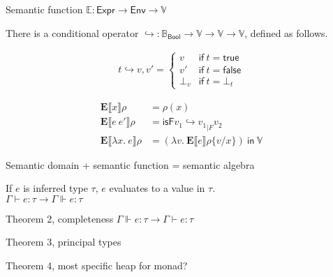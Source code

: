 Semantic function $\mathbb{E} : \mathsf{Expr} \rightarrow \mathsf{Env} \rightarrow \mathbb{V}$


There is a conditional operator $\hookrightarrow : \mathbb{B}_{\textsf{Bool}} \rightarrow \mathbb{V} \rightarrow \mathbb{V} \rightarrow \mathbb{V}$, defined as follows.

\begin{align*}
  t \hookrightarrow v, v' =
  \begin{cases}
    v & \textsf{if} \ t = \textsf{true} \\
    v' & \textsf{if} \ t = \textsf{false} \\
    \bot_v & \textsf{if} \ t = \bot_t
  \end{cases}
\end{align*}

\begin{align*}
  \mathbf{E} \llbracket x \rrbracket \rho &= \rho(x) \\
  \mathbf{E} \llbracket e \ e' \rrbracket \rho &= \textsf{isF} v_1 \hookrightarrow
                                              {v_1}_{|F} v_2 \\
  \mathbf{E} \llbracket \lambda x . \ e \rrbracket \rho &=
  (\lambda v . \ \mathbf{E} \llbracket e \rrbracket \rho \{ v / x \} ) \
                                                 \textsf{in} \ \mathbb{V}
\end{align*}

Semantic domain + semantic function = semantic algebra


\begin{theorem}[Soundness]
  If $e$ is inferred type $\tau$, $e$ evaluates to a value in $\tau$. \\
  $\Gamma \vdash e : \tau \rightarrow \Gamma \Vdash e : \tau$
\end{theorem}

Theorem 2, completeness $\Gamma \Vdash e : \tau \rightarrow \Gamma \vdash e : \tau$

Theorem 3, principal types

Theorem 4, most specific heap for monad?


  

